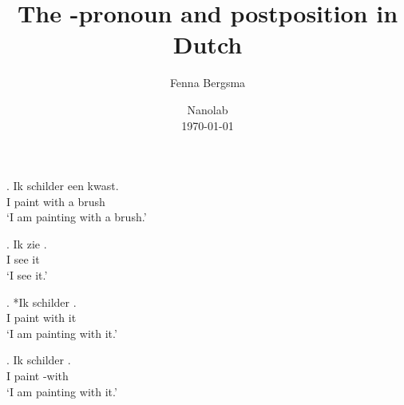 \documentclass[xcolor=dvipsnames,10pt]{beamer}
\title{The \tsc{r}-pronoun and postposition \tit{waar-mee} in Dutch}
\author{Fenna Bergsma}
\date{Nanolab\\ \today}
\institute{Goethe-Universität Frankfurt}
\begin{document}
\begin{frame}
	\titlepage

\end{frame}


\begin{frame}

\exg. Ik schilder  een kwast.\\
 I paint with a brush\\
 `I am painting with a brush.'\label{ex:metdp}

 \pause

\exg. Ik zie .\\
 I see it\\
 `I see it.'\label{ex:tverb}

\pause

\exg. *Ik schilder  .\\
 I paint with it\\
 `I am painting with it.'

\pause

\exg. Ik schilder  .\\
 I paint  -with\\
 `I am painting with it.'\label{ex:jarmee}

\end{frame}


\begin{frame}


\end{frame}
\end{document}
